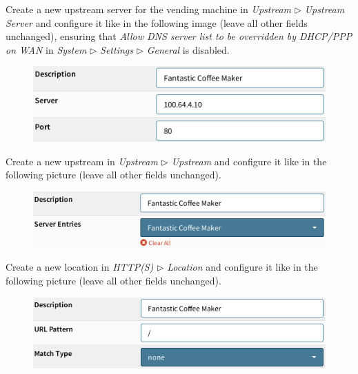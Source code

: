 \documentclass[draft]{homework}
\begin{document}
    Create a new upstream server for the vending machine in \textit{Upstream} $\triangleright$ \textit{Upstream Server} and configure it like in the following image (leave all other fields unchanged), ensuring that \textit{Allow DNS server list to be overridden by DHCP/PPP on WAN } in \textit{System} $\triangleright$ \textit{Settings} $\triangleright$ \textit{General} is disabled.
    \vspace{-5pt}
    \begin{figure}[H]
        \centering
        \includegraphics[width=\linewidth]{images/upstream-server}
        \label{fig:upstream-server}
    \end{figure}
    \vspace{-20pt}
    
    Create a new upstream in \textit{Upstream} $\triangleright$ \textit{Upstream} and configure it like in the following picture (leave all other fields unchanged).
    \vspace{-5pt}
    \begin{figure}[H]
        \centering
        \includegraphics[width=1\linewidth]{images/upstream}
        \label{fig:upstream}
    \end{figure}
    \vspace{-20pt}
    
    Create a new location in \textit{HTTP(S)} $\triangleright$ \textit{Location} and configure it like in the following picture (leave all other fields unchanged).
    \vspace{-5pt}
    \begin{figure}[H]
        \centering
        \includegraphics[width=1\linewidth]{images/location}
        \label{fig:location}
    \end{figure}
    \vspace{-20pt}
    
\end{document}
